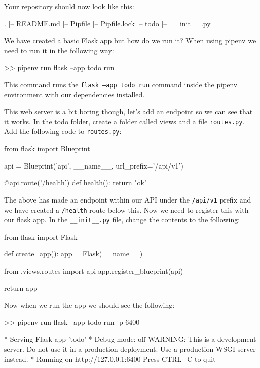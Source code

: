 \documentclass{csse4400}
\begin{document}
Your repository should now look like this:

\begin{code}[language=bash,numbers=none]{}
  .
  |-- README.md
  |-- Pipfile
  |-- Pipfile.lock
  |-- todo
      |-- __init__.py
\end{code}

We have created a basic Flask app but how do we run it?
When using pipenv we need to run it in the following way:

\begin{code}[language=bash,numbers=none]{}
  >> pipenv run flask --app todo run
\end{code}

This command runs the \texttt{flask --app todo run} command inside the pipenv environment with our dependencies installed.

This web server is a bit boring though, let's add an endpoint so we can see that it works. In the todo folder, create a folder called views and a file \texttt{routes.py}. Add the following code to  \texttt{routes.py}:

\begin{code}[language=python]{}

  from flask import Blueprint

  api = Blueprint('api', __name__, url_prefix='/api/v1')

  @api.route('/health')
  def health():
      return "ok"

\end{code}

The above has made an endpoint within our API under the \texttt{/api/v1} prefix and we have created a \texttt{/health} route below this. Now we need to register this with our flask app. In the \texttt{\_\_init\_\_.py} file, change the contents to the following:

\begin{code}[language=python]{}
  from flask import Flask

  def create_app():
      app = Flask(__name__)
      
      from .views.routes import api
      app.register_blueprint(api)
      
      return app

\end{code}

Now when we run the app we should see the following:

\begin{code}[language=bash,numbers=none]{}
  >> pipenv run flask --app todo run -p 6400

  * Serving Flask app 'todo'
  * Debug mode: off
  WARNING: This is a development server. Do not use it in a production deployment. Use a production WSGI server instead.
  * Running on http://127.0.0.1:6400
  Press CTRL+C to quit
\end{code}
\end{document}
